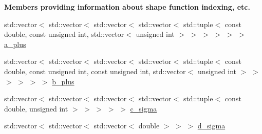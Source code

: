 \begin{Indent}{\bf Members providing information about shape function indexing, etc.}
\begin{DoxyCompactItemize}
std\+::vector$<$ std\+::vector$<$ std\+::vector$<$ std\+::vector$<$ std\+::tuple$<$ const double, const unsigned int, std\+::vector$<$ unsigned int $>$ $>$ $>$ $>$ $>$ $>$ \hyperlink{class_assembly_helper_a8eb513a6239d94cc0f1a6a01a037c572}{a\+\_\+plus}
\item 
std\+::vector$<$ std\+::vector$<$ std\+::vector$<$ std\+::vector$<$ std\+::tuple$<$ const double, const unsigned int, const unsigned int, std\+::vector$<$ unsigned int $>$ $>$ $>$ $>$ $>$ $>$ \hyperlink{class_assembly_helper_ab09dd07d3ec596525be83f8f5859bef7}{b\+\_\+plus}
\item 
std\+::vector$<$ std\+::vector$<$ std\+::vector$<$ std\+::vector$<$ std\+::tuple$<$ const double, unsigned int $>$ $>$ $>$ $>$ $>$ \hyperlink{class_assembly_helper_ab3d4370661ba726010ee687ef0e98140}{c\+\_\+sigma}
\item 
std\+::vector$<$ std\+::vector$<$ std\+::vector$<$ double $>$ $>$ $>$ \hyperlink{class_assembly_helper_a48d7d677120eb1c84b4983f470246e02}{d\+\_\+sigma}
\end{DoxyCompactItemize}
\end{Indent}
